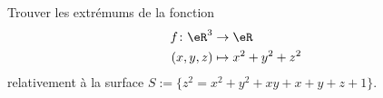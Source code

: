 
\begin{exercice}\label{exoVariete0005}

Trouver les extrémums de la fonction 
\begin{equation}
	\begin{aligned}
		f\colon \eR^3&\to \eR \\
		(x,y,z)&\mapsto x^2+y^2+z^2 
	\end{aligned}
\end{equation}
relativement à la surface $S := \{ z^2 = x^2 + y^2 + xy + x + y + z + 1 \}$.


\end{exercice}
